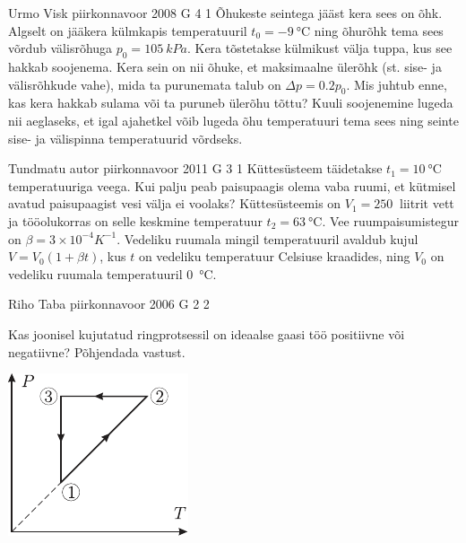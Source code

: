 \documentclass[11pt]{article}
\begin{document}
{%
{Urmo Visk} %
{piirkonnavoor} %
{2008} %
{G 4} %
{1} %
{
\ifStatement
Õhukeste seintega jääst kera sees on õhk. Algselt on jääkera külmkapis temperatuuril $t_0 = \SI{-9}{\celsius}$ ning õhurõhk tema sees võrdub välisrõhuga $p_0 = \SI{105}{kPa}$. Kera tõstetakse külmikust välja tuppa, kus see hakkab soojenema. Kera sein on nii õhuke, et maksimaalne ülerõhk (st. sise- ja välisrõhkude vahe), mida ta purunemata talub on $\Delta p = \num{0,2}p_0$. Mis juhtub enne, kas kera hakkab sulama või ta puruneb ülerõhu tõttu? Kuuli soojenemine lugeda nii aeglaseks, et igal ajahetkel võib lugeda õhu temperatuuri tema sees ning seinte sise- ja välispinna temperatuurid võrdseks.
\fi
}

{Tundmatu autor} %
{piirkonnavoor} %
{2011} %
{G 3} %
{1} %
{
\ifStatement
Küttesüsteem täidetakse $t_1=\SI{10}{\celsius}$ temperatuuriga veega. Kui palju peab paisupaagis olema vaba ruumi, et kütmisel avatud paisupaagist vesi välja ei voolaks? Küttesüsteemis on $V_1=\SI{250}{}$ liitrit vett ja tööolukorras on selle keskmine temperatuur $t_2=\SI{63}{\celsius}$. Vee ruumpaisumistegur on $\beta=3\times 10^{-4}K^{-1}$. Vedeliku ruumala mingil temperatuuril avaldub kujul $V=V_{0}(1+\beta t)$, kus $t$ on vedeliku temperatuur Celsiuse kraadides, ning $V_{0}$ on vedeliku ruumala temperatuuril \SI{0}{\celsius}.
\fi
}

{Riho Taba} %
{piirkonnavoor} %
{2006} %
{G 2} %
{2} %
{
\ifStatement
Kas joonisel kujutatud ringprotsessil on ideaalse gaasi töö positiivne või negatiivne? Põhjendada vastust.

\begin{center}
	\includegraphics[width=0.4\linewidth]{2006-v2g-02-yl}
\end{center}
\fi
}

}
\end{document}
